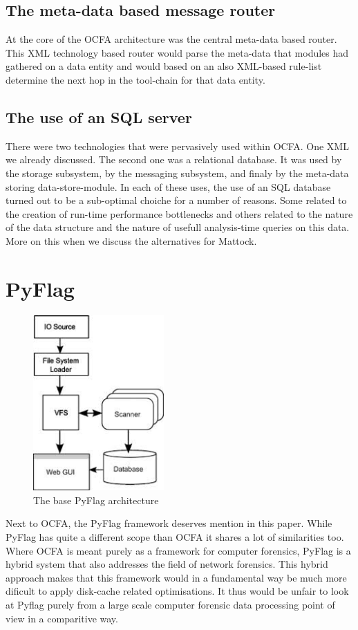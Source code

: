 \subsection{The meta-data based message router}
At the core of the OCFA architecture was the central meta-data based router. This XML technology based router would parse the meta-data that modules had gathered on a data entity and would based on an also XML-based rule-list determine the next hop in the tool-chain for that data entity. 
\subsection{The use of an SQL server}
There were two technologies that were pervasively used within OCFA. One XML we already discussed. The second one was a relational database. It was used by the storage subsystem, by the messaging subsystem, and finaly by the meta-data storing data-store-module. In each of these uses, the use of an SQL database turned out to be a sub-optimal choiche for a number of reasons. Some related to the creation of run-time performance bottlenecks and others related to the nature of the data structure and the nature of usefull analysis-time queries on this data. More on this when we discuss the alternatives for Mattock.
\section{PyFlag}
\begin{figure}
\centering
\includegraphics[width=50mm]{mattock/pyflag.jpg}
\caption{The base PyFlag architecture}
\label{fig:FlowInOut}
\end{figure}
Next to OCFA, the PyFlag framework deserves mention in this paper. While PyFlag has quite a different scope than OCFA it shares a lot of similarities too. Where OCFA is meant purely as a framework for computer forensics, PyFlag is a hybrid system that also addresses the field of network forensics. This hybrid approach makes that this framework would in a fundamental way be much more dificult to apply disk-cache related optimisations. It thus would be unfair to look at Pyflag purely from a large scale computer forensic data processing point of view in a comparitive way. 
